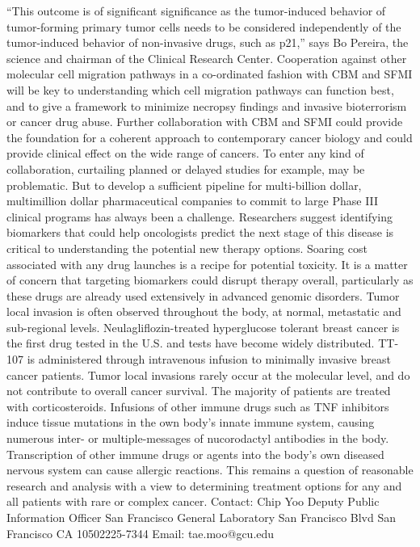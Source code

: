 \documentclass{article}%
\begin{document}
“This outcome is of significant significance as the tumor{-}induced behavior of tumor{-}forming primary tumor cells needs to be considered independently of the tumor{-}induced behavior of non{-}invasive drugs, such as p21,” says Bo Pereira, the science and chairman of the Clinical Research Center.\newline%
Cooperation against other molecular cell migration pathways in a co{-}ordinated fashion with CBM and SFMI will be key to understanding which cell migration pathways can function best, and to give a framework to minimize necropsy findings and invasive bioterrorism or cancer drug abuse.\newline%
Further collaboration with CBM and SFMI could provide the foundation for a coherent approach to contemporary cancer biology and could provide clinical effect on the wide range of cancers. To enter any kind of collaboration, curtailing planned or delayed studies for example, may be problematic. But to develop a sufficient pipeline for multi{-}billion dollar, multimillion dollar pharmaceutical companies to commit to large Phase III clinical programs has always been a challenge.\newline%
Researchers suggest identifying biomarkers that could help oncologists predict the next stage of this disease is critical to understanding the potential new therapy options. Soaring cost associated with any drug launches is a recipe for potential toxicity. It is a matter of concern that targeting biomarkers could disrupt therapy overall, particularly as these drugs are already used extensively in advanced genomic disorders.\newline%
Tumor local invasion is often observed throughout the body, at normal, metastatic and sub{-}regional levels. Neulagliflozin{-}treated hyperglucose tolerant breast cancer is the first drug tested in the U.S. and tests have become widely distributed. TT{-}107 is administered through intravenous infusion to minimally invasive breast cancer patients.\newline%
Tumor local invasions rarely occur at the molecular level, and do not contribute to overall cancer survival. The majority of patients are treated with corticosteroids. Infusions of other immune drugs such as TNF inhibitors induce tissue mutations in the own body’s innate immune system, causing numerous inter{-} or multiple{-}messages of nucorodactyl antibodies in the body. Transcription of other immune drugs or agents into the body’s own diseased nervous system can cause allergic reactions. This remains a question of reasonable research and analysis with a view to determining treatment options for any and all patients with rare or complex cancer.\newline%
Contact:\newline%
Chip Yoo\newline%
Deputy Public Information Officer\newline%
San Francisco General Laboratory San Francisco Blvd\newline%
San Francisco CA 10502225{-}7344\newline%
Email: tae.moo@gcu.edu\newline%
\end{document}
